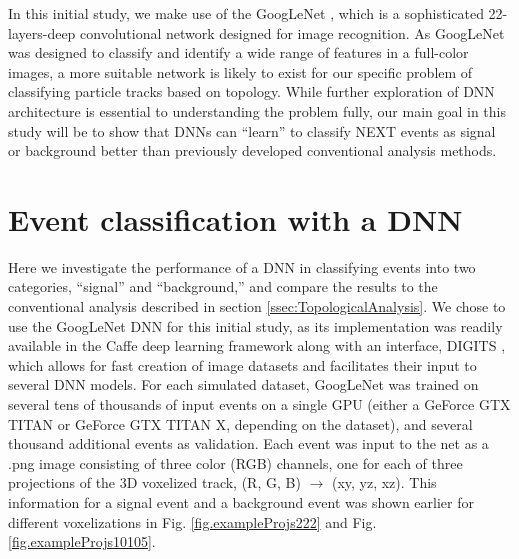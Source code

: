 \documentclass[a4paper,11pt]{article}
\begin{document}
In this initial study, we make use of the GoogLeNet \cite{Googlenet}, which is a sophisticated 22-layers-deep convolutional network designed for image recognition.  As GoogLeNet was
designed to classify and identify a wide range of features in a full-color images, a more suitable network is likely to exist for our specific problem of classifying particle tracks based on
topology.  While further exploration of DNN architecture is essential to understanding the problem fully, our main goal in this study will be to show that DNNs can ``learn'' to classify 
NEXT events as signal or background better than previously developed conventional analysis methods.

\section{Event classification with a DNN}

Here we investigate the performance of a DNN in classifying events into two categories, ``signal'' and ``background,'' and compare the results to the conventional analysis described in
section \ref{ssec:TopologicalAnalysis}.  We chose to use the GoogLeNet DNN for this initial study, as its implementation was readily available in the Caffe \cite{jia2014caffe}
deep learning framework along with an interface, DIGITS \cite{DIGITS}, which allows for fast creation of image datasets and facilitates their input to several DNN models.  For each simulated
dataset, GoogLeNet was trained on several tens of thousands of input events on a single GPU (either a GeForce GTX TITAN or GeForce GTX TITAN X, depending on the dataset), and several
thousand additional events as validation.  Each event was input to the net as a .png image consisting of three
color (RGB) channels, one for each of three projections of the 3D voxelized track, (R, G, B) $\rightarrow$ (xy, yz, xz).  This information for a signal event and a background event was
shown earlier for different voxelizations in Fig. \ref{fig.exampleProjs222} and Fig. \ref{fig.exampleProjs10105}.
\end{document}
